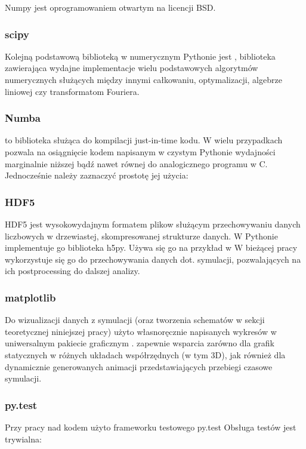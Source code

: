     Numpy jest oprogramowaniem otwartym na licencji BSD. %

    \subsubsection{scipy}
    Kolejną podstawową biblioteką w numerycznym Pythonie jest , biblioteka
    zawierająca wydajne implementacje wielu podstawowych algorytmów numerycznych służących
    między innymi całkowaniu, optymalizacji, algebrze liniowej czy transformatom Fouriera.

    \subsubsection{Numba}
     to biblioteka służąca do kompilacji just-in-time kodu. %
    W wielu przypadkach %
    pozwala na osiągnięcie kodem napisanym w czystym Pythonie wydajności marginalnie
    niższej bądź nawet równej do analogicznego programu w C. %
    Jednocześnie należy zaznaczyć prostotę jej użycia: %



    \subsubsection{HDF5}
    HDF5 jest wysokowydajnym formatem plikow służącym przechowywaniu danych liczbowych w drzewiastej,
    skompresowanej strukturze danych.
    W Pythonie implementuje go biblioteka h5py.
    Używa się go na przykład w %
    W bieżącej pracy wykorzystuje się go do przechowywania danych dot. symulacji,
    pozwalających na ich postprocessing do dalszej analizy.

    \subsubsection{matplotlib}
    Do wizualizacji danych z symulacji
    (oraz tworzenia schematów w sekcji teoretycznej niniejszej pracy)
    użyto własnoręcznie napisanych wykresów w uniwersalnym
    pakiecie graficznym .  zapewnie wsparcia zarówno
    dla grafik statycznych w różnych układach współrzędnych (w tym 3D), jak również dla
    dynamicznie generowanych animacji przedstawiających przebiegi czasowe symulacji.

    \subsubsection{py.test}
    Przy pracy nad kodem użyto frameworku testowego py.test %
    Obsługa testów jest trywialna:

